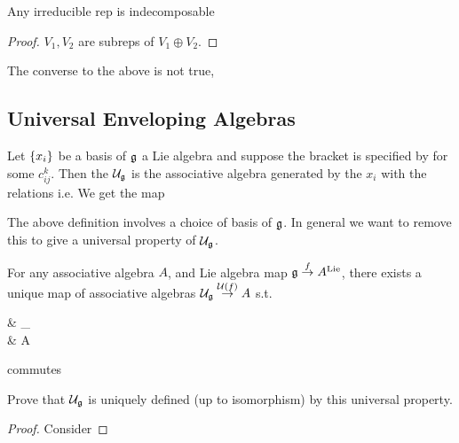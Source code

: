 \documentclass{article}
\begin{document}
\begin{prop}
	Any irreducible rep is indecomposable
\end{prop}
\begin{proof}
	$V_1, V_2 $ are subreps of $V_1 \oplus V_2$. 
\end{proof}

\begin{remark}
	The converse to the above is not true, 
\end{remark}

\subsection{Universal Enveloping Algebras}

\begin{definition}
	Let $\left\{ x_i \right\}$ be a basis of $\mathfrak{g}$ a Lie algebra and suppose the bracket is specified by 
	for some  $c_{ij}^k$. Then the  $\mathcal{U}_{\mathfrak{g}}$ is the associative algebra generated by the $x_i$ with the relations 
	i.e. 
	We get the map 
\end{definition}


The above definition involves a choice of basis of $\mathfrak{g}$. In general we want to remove this to give a universal property of $\mathcal{U}_{\mathfrak{g}}$. 

\begin{prop}
	For any associative algebra $A$, and Lie algebra map $\mathfrak{g} \overset{f}{\to} A^{\text{Lie}}$, there exists a unique map of associative algebras $\mathcal{U}_{\mathfrak{g}} \overset{\mathcal{U}(f)}{\to} A$ s.t. 
	\begin{tkz}
		& _ \arrow[d,"\mc{U}(f)"] \\
		 \arrow[ur,"\iota"] \arrow[r,"f"] & A
	\end{tkz}
	commutes
\end{prop}

\begin{ex}
	Prove that $\mathcal{U}_{\mathfrak{g}}$ is uniquely defined (up to isomorphism) by this universal property. 
\end{ex}
\begin{proof}
	Consider
\end{proof}
\end{document}
